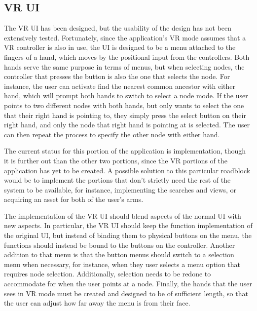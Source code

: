 \documentclass[onecolumn, draftclsnofoot, 10pt, compsoc]{IEEEtran}
\begin{document}
\subsection{VR UI}
\begin{singlespace}
The VR UI has been designed, but the usability of the design has not been extensively tested. Fortunately, since the application's VR mode assumes that a VR controller is also in use, the UI is designed to be a menu attached to the fingers of a hand, which moves by the positional input from the controllers. Both hands serve the same purpose in terms of menus, but when selecting nodes, the controller that presses the button is also the one that selects the node. For instance, the user can activate find the nearest common ancestor with either hand, which will prompt both hands to switch to select a node mode. If the user points to two different nodes with both hands, but only wants to select the one that their right hand is pointing to, they simply press the select button on their right hand, and only the node that right hand is pointing at is selected. The user can then repeat the process to specify the other node with either hand.

The current status for this portion of the application is implementation, though it is further out than the other two portions, since the VR portions of the application has yet to be created. A possible solution to this particular roadblock would be to implement the portions that don't strictly need the rest of the system to be available, for instance, implementing the searches and views, or acquiring an asset for both of the user's arms.

The implementation of the VR UI should blend aspects of the normal UI with new aspects. In particular, the VR UI should keep the function implementation of the original UI, but instead of binding them to physical buttons on the menu, the functions should instead be bound to the buttons on the controller. Another addition to that menu is that the button menus should switch to a selection menu when necessary, for instance, when they user selects a menu option that requires node selection. Additionally, selection needs to be redone to accommodate for when the user points at a node. Finally, the hands that the user sees in VR mode must be created and designed to be of sufficient length, so that the user can adjust how far away the menu is from their face.
\end{singlespace}
\end{document}
